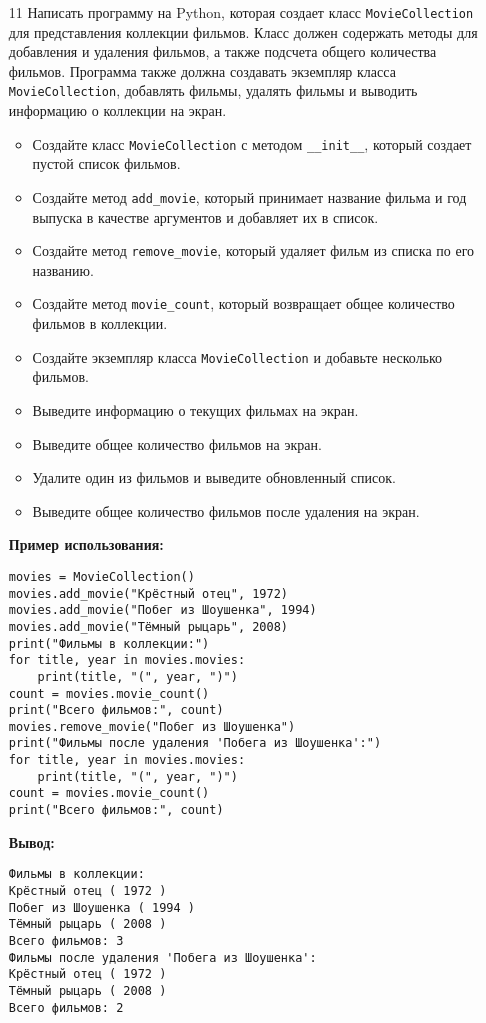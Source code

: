 \begin{enumerate}
\item[11] Написать программу на Python, которая создает класс \texttt{MovieCollection} для представления коллекции фильмов. Класс должен содержать методы для добавления и удаления фильмов, а также подсчета общего количества фильмов. Программа также должна создавать экземпляр класса \texttt{MovieCollection}, добавлять фильмы, удалять фильмы и выводить информацию о коллекции на экран.

\begin{itemize}
    \item Создайте класс \texttt{MovieCollection} с методом \texttt{\_\_init\_\_}, который создает пустой список фильмов.
    \item Создайте метод \texttt{add\_movie}, который принимает название фильма и год выпуска в качестве аргументов и добавляет их в список.
    \item Создайте метод \texttt{remove\_movie}, который удаляет фильм из списка по его названию.
    \item Создайте метод \texttt{movie\_count}, который возвращает общее количество фильмов в коллекции.
    \item Создайте экземпляр класса \texttt{MovieCollection} и добавьте несколько фильмов.
    \item Выведите информацию о текущих фильмах на экран.
    \item Выведите общее количество фильмов на экран.
    \item Удалите один из фильмов и выведите обновленный список.
    \item Выведите общее количество фильмов после удаления на экран.
\end{itemize}

\textbf{Пример использования:}

\begin{verbatim}
movies = MovieCollection()
movies.add_movie("Крёстный отец", 1972)
movies.add_movie("Побег из Шоушенка", 1994)
movies.add_movie("Тёмный рыцарь", 2008)
print("Фильмы в коллекции:")
for title, year in movies.movies:
    print(title, "(", year, ")")
count = movies.movie_count()
print("Всего фильмов:", count)
movies.remove_movie("Побег из Шоушенка")
print("Фильмы после удаления 'Побега из Шоушенка':")
for title, year in movies.movies:
    print(title, "(", year, ")")
count = movies.movie_count()
print("Всего фильмов:", count)
\end{verbatim}

\textbf{Вывод:}
\begin{verbatim}
Фильмы в коллекции:
Крёстный отец ( 1972 )
Побег из Шоушенка ( 1994 )
Тёмный рыцарь ( 2008 )
Всего фильмов: 3
Фильмы после удаления 'Побега из Шоушенка':
Крёстный отец ( 1972 )
Тёмный рыцарь ( 2008 )
Всего фильмов: 2
\end{verbatim}


\end{enumerate}
